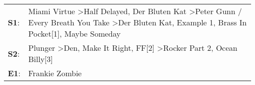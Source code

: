 \begin{supertabular}{p{0.03\textwidth}p{0.92\textwidth}}
 \textbf{S1}:  &  Miami Virtue\textsuperscript{} \textgreater \enspace Half Delayed\textsuperscript{}, \enspace Der Bluten Kat\textsuperscript{} \textgreater \enspace Peter Gunn / Every Breath You Take\textsuperscript{} \textgreater \enspace Der Bluten Kat\textsuperscript{}, \enspace Example 1\textsuperscript{}, \enspace Brass In Pocket[1]\textsuperscript{}, \enspace Maybe Someday\textsuperscript{}  \enspace  \\
 \textbf{S2}:  &                                                                                                                                               Plunger\textsuperscript{} \textgreater \enspace Den\textsuperscript{}, \enspace Make It Right\textsuperscript{}, \enspace FF[2]\textsuperscript{} \textgreater \enspace Rocker Part 2\textsuperscript{}, \enspace Ocean Billy[3]\textsuperscript{}  \enspace  \\
 \textbf{E1}:  &                                                                                                                                                                                                                                                                                                                                                                 Frankie Zombie\textsuperscript{}  \enspace  \\
\end{supertabular}
